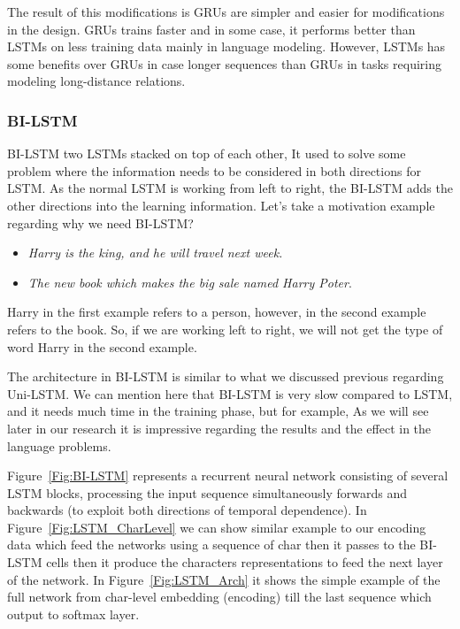 The result of this modifications is GRUs are simpler and easier for modifications in the design. GRUs trains faster and in some case, it performs better than LSTMs on less training data mainly in language modeling. However, LSTMs has some benefits over GRUs in case longer sequences than GRUs in tasks requiring modeling long-distance relations. 


 
\subsubsection{BI-LSTM}\label{Sec:Bi_Lstm}

BI-LSTM two LSTMs stacked on top of each other, It used to solve some problem where the information needs to be considered in both directions for LSTM. As the normal LSTM is working from left to right, the BI-LSTM adds the other directions into the learning information. Let's take a motivation example regarding why we need BI-LSTM?
\begin{itemize}
\item \textit{Harry is the king, and he will travel next week.}
\item \textit{The new book which makes the big sale named Harry Poter}.
\end{itemize}
Harry in the first example refers to a person, however, in the second example refers to the book. So, if we are working left to right, we will not get the type of word Harry in the second example.

The architecture in BI-LSTM is similar to what we discussed previous regarding Uni-LSTM. We can mention here that BI-LSTM is very slow compared to LSTM, and it needs much time in the training phase, but for example, As we will see later in our research it is impressive regarding the results and the effect in the language problems.

Figure~\ref{Fig:BI-LSTM} represents a recurrent neural network consisting of several LSTM blocks, processing the input sequence simultaneously forwards and backwards (to exploit both directions of temporal dependence). In Figure~\ref{Fig:LSTM_CharLevel} we can show similar example to our encoding data which feed the networks using a sequence of char then it passes to the BI-LSTM cells then it produce the characters representations to feed the next layer of the network. In Figure~\ref{Fig:LSTM_Arch} it shows the simple example of the full network from char-level embedding (encoding) till the last sequence which output to softmax layer.


